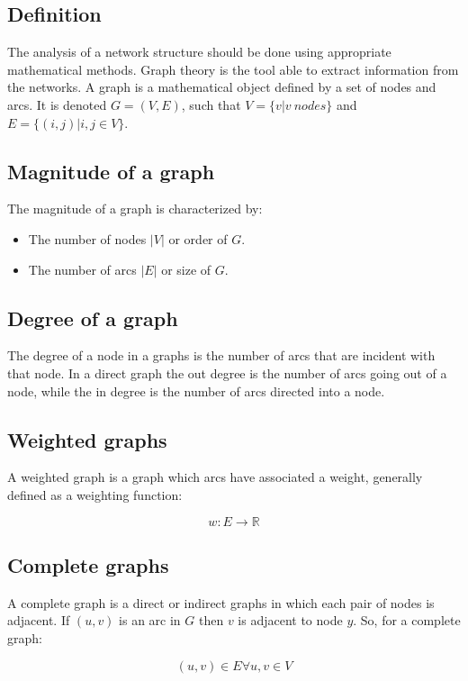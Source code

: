	\subsection{Definition}
	The analysis of a network structure should be done using appropriate mathematical methods.
	Graph theory is the tool able to extract information from the networks.
	A graph is a mathematical object defined by a set of nodes and arcs.
	It is denoted $G = (V, E)$, such that $V = \{v|v\ nodes\}$ and $E = \{(i,j)|i,j\in V\}$.

	\subsection{Magnitude of a graph}
	The magnitude of a graph is characterized by:

	\begin{multicols}{2}
		\begin{itemize}
			\item The number of nodes $|V|$ or order of $G$.
			\item The number of arcs $|E|$ or size of $G$.
		\end{itemize}
	\end{multicols}

	\subsection{Degree of a graph}
	The degree of a node in a graphs is the number of arcs that are incident with that node.
	In a direct graph the out degree is the number of arcs going out of a node, while the in degree is the number of arcs directed into a node.

	\subsection{Weighted graphs}
	A weighted graph is a graph which arcs have associated a weight, generally defined as a weighting function:

	$$w:E\rightarrow\mathbb{R}$$

	\subsection{Complete graphs}
	A complete graph is a direct or indirect graphs in which each pair of nodes is adjacent.
	If $(u,v)$ is an arc in $G$ then $v$ is adjacent to node $y$.
	So, for a complete graph:

	$$(u,v)\in E\forall u,v\in V$$

